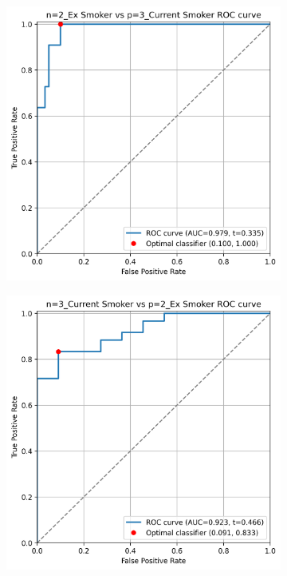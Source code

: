 \documentclass[draft]{article} %
\begin{document}
\begin{figure}[p]
    \begin{subfigure}{0.46\linewidth}
        \centering
        \includegraphics[width=\linewidth]{cohort1/test_2v3_roc.png}
    \end{subfigure}
    \hspace{4mm}
    \begin{subfigure}{0.46\linewidth}
        \centering
        \includegraphics[width=\linewidth]{cohort1/test_3v2_roc.png}
    \end{subfigure}


\end{figure}
\end{document}
